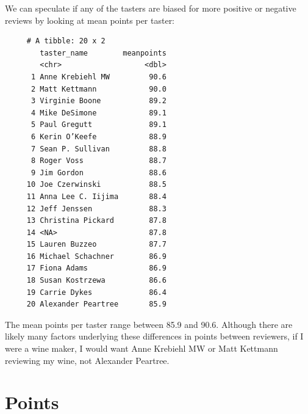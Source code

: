 \documentclass[12pt,twoside]{amherstthesis}
\newenvironment{Shaded}{\begin{snugshade}}{\end{snugshade}}
\newcommand{\KeywordTok}[1]{\textcolor[rgb]{0.13,0.29,0.53}{\textbf{#1}}}
\newcommand{\DataTypeTok}[1]{\textcolor[rgb]{0.13,0.29,0.53}{#1}}
\newcommand{\StringTok}[1]{\textcolor[rgb]{0.31,0.60,0.02}{#1}}
\newcommand{\OperatorTok}[1]{\textcolor[rgb]{0.81,0.36,0.00}{\textbf{#1}}}
\newcommand{\NormalTok}[1]{#1}
\begin{document}
We can speculate if any of the tasters are biased for more positive or
negative reviews by looking at mean points per taster:
\begin{Shaded}
\end{Shaded}
\begin{verbatim}
     # A tibble: 20 x 2
        taster_name        meanpoints
        <chr>                   <dbl>
      1 Anne Krebiehl MW         90.6
      2 Matt Kettmann            90.0
      3 Virginie Boone           89.2
      4 Mike DeSimone            89.1
      5 Paul Gregutt             89.1
      6 Kerin O’Keefe            88.9
      7 Sean P. Sullivan         88.8
      8 Roger Voss               88.7
      9 Jim Gordon               88.6
     10 Joe Czerwinski           88.5
     11 Anna Lee C. Iijima       88.4
     12 Jeff Jenssen             88.3
     13 Christina Pickard        87.8
     14 <NA>                     87.8
     15 Lauren Buzzeo            87.7
     16 Michael Schachner        86.9
     17 Fiona Adams              86.9
     18 Susan Kostrzewa          86.6
     19 Carrie Dykes             86.4
     20 Alexander Peartree       85.9
\end{verbatim}
The mean points per taster range between 85.9 and 90.6. Although there
are likely many factors underlying these differences in points between
reviewers, if I were a wine maker, I would want Anne Krebiehl MW or Matt
Kettmann reviewing my wine, not Alexander Peartree.

\section{Points}\label{points}
\end{document}

